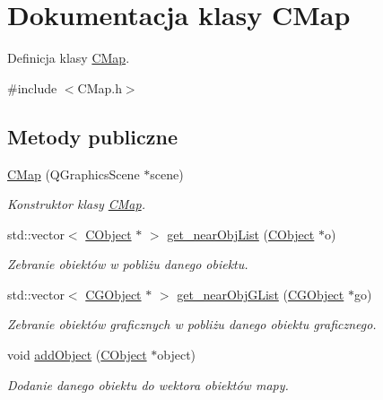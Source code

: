 \hypertarget{class_c_map}{}\section{Dokumentacja klasy C\+Map}
\label{class_c_map}


Definicja klasy \mbox{\hyperlink{class_c_map}{C\+Map}}.  




{\ttfamily \#include $<$C\+Map.\+h$>$}

\subsection*{Metody publiczne}
\begin{DoxyCompactItemize}
\item 
\mbox{\hyperlink{class_c_map_a23632998cdecdd0b9c77c799e5d5d51b}{C\+Map}} (Q\+Graphics\+Scene $\ast$scene)
\begin{DoxyCompactList}\small\item\em Konstruktor klasy \mbox{\hyperlink{class_c_map}{C\+Map}}. \end{DoxyCompactList}\item 
std\+::vector$<$ \mbox{\hyperlink{class_c_object}{C\+Object}} $\ast$ $>$ \mbox{\hyperlink{class_c_map_a7482c6d9d6c9a0b4d4a8fb8b0d9f78c1}{get\+\_\+near\+Obj\+List}} (\mbox{\hyperlink{class_c_object}{C\+Object}} $\ast$o)
\begin{DoxyCompactList}\small\item\em Zebranie obiektów w pobliżu danego obiektu. \end{DoxyCompactList}\item 
std\+::vector$<$ \mbox{\hyperlink{class_c_g_object}{C\+G\+Object}} $\ast$ $>$ \mbox{\hyperlink{class_c_map_a92ba9186009ccd9c773c3647ff855d36}{get\+\_\+near\+Obj\+G\+List}} (\mbox{\hyperlink{class_c_g_object}{C\+G\+Object}} $\ast$go)
\begin{DoxyCompactList}\small\item\em Zebranie obiektów graficznych w pobliżu danego obiektu graficznego. \end{DoxyCompactList}\item 
void \mbox{\hyperlink{class_c_map_a4b22b964e9d16e428c0a56b15b235c82}{add\+Object}} (\mbox{\hyperlink{class_c_object}{C\+Object}} $\ast$object)
\begin{DoxyCompactList}\small\item\em Dodanie danego obiektu do wektora obiektów mapy. \end{DoxyCompactList}\item 

\end{DoxyCompactItemize}
